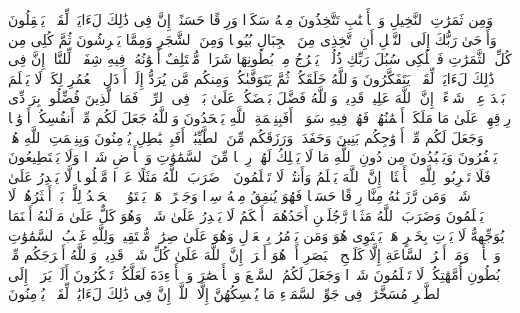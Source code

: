 \stopbuffer%
\startbuffer[\q:16:67]
وَمِن ثَمَرَٰتِ ٱلنَّخِیلِ وَٱلۡأَعۡنَٰبِ تَتَّخِذُونَ مِنۡهُ سَكَرࣰا وَرِزۡقًا حَسَنًاۚ إِنَّ فِی ذَٰلِكَ لَءَایَةࣰ لِّقَوۡمࣲ یَعۡقِلُونَ%
\stopbuffer%
\startbuffer[\q:16:68]
وَأَوۡحَىٰ رَبُّكَ إِلَى ٱلنَّحۡلِ أَنِ ٱتَّخِذِی مِنَ ٱلۡجِبَالِ بُیُوتࣰا وَمِنَ ٱلشَّجَرِ وَمِمَّا یَعۡرِشُونَ%
\stopbuffer%
\startbuffer[\q:16:69]
ثُمَّ كُلِی مِن كُلِّ ٱلثَّمَرَٰتِ فَٱسۡلُكِی سُبُلَ رَبِّكِ ذُلُلࣰاۚ یَخۡرُجُ مِنۢ بُطُونِهَا شَرَابࣱ مُّخۡتَلِفٌ أَلۡوَٰنُهُۥ فِیهِ شِفَاۤءࣱ لِّلنَّاسِۚ إِنَّ فِی ذَٰلِكَ لَءَایَةࣰ لِّقَوۡمࣲ یَتَفَكَّرُونَ%
\stopbuffer%
\startbuffer[\q:16:70]
وَٱللَّهُ خَلَقَكُمۡ ثُمَّ یَتَوَفَّىٰكُمۡۚ وَمِنكُم مَّن یُرَدُّ إِلَىٰۤ أَرۡذَلِ ٱلۡعُمُرِ لِكَیۡ لَا یَعۡلَمَ بَعۡدَ عِلۡمࣲ شَیۡءًاۚ إِنَّ ٱللَّهَ عَلِیمࣱ قَدِیرࣱ%
\stopbuffer%
\startbuffer[\q:16:71]
وَٱللَّهُ فَضَّلَ بَعۡضَكُمۡ عَلَىٰ بَعۡضࣲ فِی ٱلرِّزۡقِۚ فَمَا ٱلَّذِینَ فُضِّلُوا۟ بِرَاۤدِّی رِزۡقِهِمۡ عَلَىٰ مَا مَلَكَتۡ أَیۡمَٰنُهُمۡ فَهُمۡ فِیهِ سَوَاۤءٌۚ أَفَبِنِعۡمَةِ ٱللَّهِ یَجۡحَدُونَ%
\stopbuffer%
\startbuffer[\q:16:72]
وَٱللَّهُ جَعَلَ لَكُم مِّنۡ أَنفُسِكُمۡ أَزۡوَٰجࣰا وَجَعَلَ لَكُم مِّنۡ أَزۡوَٰجِكُم بَنِینَ وَحَفَدَةࣰ وَرَزَقَكُم مِّنَ ٱلطَّیِّبَٰتِۚ أَفَبِٱلۡبَٰطِلِ یُؤۡمِنُونَ وَبِنِعۡمَتِ ٱللَّهِ هُمۡ یَكۡفُرُونَ%
\stopbuffer%
\startbuffer[\q:16:73]
وَیَعۡبُدُونَ مِن دُونِ ٱللَّهِ مَا لَا یَمۡلِكُ لَهُمۡ رِزۡقࣰا مِّنَ ٱلسَّمَٰوَٰتِ وَٱلۡأَرۡضِ شَیۡءࣰا وَلَا یَسۡتَطِیعُونَ%
\stopbuffer%
\startbuffer[\q:16:74]
فَلَا تَضۡرِبُوا۟ لِلَّهِ ٱلۡأَمۡثَالَۚ إِنَّ ٱللَّهَ یَعۡلَمُ وَأَنتُمۡ لَا تَعۡلَمُونَ%
\stopbuffer%
\startbuffer[\q:16:75]
۞ ضَرَبَ ٱللَّهُ مَثَلًا عَبۡدࣰا مَّمۡلُوكࣰا لَّا یَقۡدِرُ عَلَىٰ شَیۡءࣲ وَمَن رَّزَقۡنَٰهُ مِنَّا رِزۡقًا حَسَنࣰا فَهُوَ یُنفِقُ مِنۡهُ سِرࣰّا وَجَهۡرًاۖ هَلۡ یَسۡتَوُۥنَۚ ٱلۡحَمۡدُ لِلَّهِۚ بَلۡ أَكۡثَرُهُمۡ لَا یَعۡلَمُونَ%
\stopbuffer%
\startbuffer[\q:16:76]
وَضَرَبَ ٱللَّهُ مَثَلࣰا رَّجُلَیۡنِ أَحَدُهُمَاۤ أَبۡكَمُ لَا یَقۡدِرُ عَلَىٰ شَیۡءࣲ وَهُوَ كَلٌّ عَلَىٰ مَوۡلَىٰهُ أَیۡنَمَا یُوَجِّههُّ لَا یَأۡتِ بِخَیۡرٍ هَلۡ یَسۡتَوِی هُوَ وَمَن یَأۡمُرُ بِٱلۡعَدۡلِ وَهُوَ عَلَىٰ صِرَٰطࣲ مُّسۡتَقِیمࣲ%
\stopbuffer%
\startbuffer[\q:16:77]
وَلِلَّهِ غَیۡبُ ٱلسَّمَٰوَٰتِ وَٱلۡأَرۡضِۚ وَمَاۤ أَمۡرُ ٱلسَّاعَةِ إِلَّا كَلَمۡحِ ٱلۡبَصَرِ أَوۡ هُوَ أَقۡرَبُۚ إِنَّ ٱللَّهَ عَلَىٰ كُلِّ شَیۡءࣲ قَدِیرࣱ%
\stopbuffer%
\startbuffer[\q:16:78]
وَٱللَّهُ أَخۡرَجَكُم مِّنۢ بُطُونِ أُمَّهَٰتِكُمۡ لَا تَعۡلَمُونَ شَیۡءࣰا وَجَعَلَ لَكُمُ ٱلسَّمۡعَ وَٱلۡأَبۡصَٰرَ وَٱلۡأَفۡءِدَةَ لَعَلَّكُمۡ تَشۡكُرُونَ%
\stopbuffer%
\startbuffer[\q:16:79]
أَلَمۡ یَرَوۡا۟ إِلَى ٱلطَّیۡرِ مُسَخَّرَٰتࣲ فِی جَوِّ ٱلسَّمَاۤءِ مَا یُمۡسِكُهُنَّ إِلَّا ٱللَّهُۚ إِنَّ فِی ذَٰلِكَ لَءَایَٰتࣲ لِّقَوۡمࣲ یُؤۡمِنُونَ%
